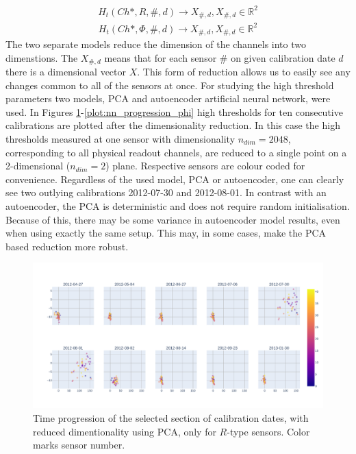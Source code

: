 \begin{align}
  H_{t}(Ch*, R, \#, d) \rightarrow X_{\#,d}, X_{\#,d} \in \mathbb{R}^{2}
  \label{eq:thr_red_R}
\end{align}
\begin{align}
  H_{t}(Ch*, \Phi, \#, d) \rightarrow X_{\#,d}, X_{\#,d} \in \mathbb{R}^{2}
  \label{eq:thr_red_phi}
\end{align}
The two separate models reduce the dimension of the channels into two dimenstions. The $X_{\#,d}$ means that for each sensor $\#$ on given calibration date $d$ there is a dimensional vector $X$.
This form of reduction allows us to easily see any changes common to all of the sensors at once. For studying the high threshold parameters two models, PCA and autoencoder artificial neural network, were used.
In Figures \ref{plot:pca_progression_phi}-\ref{plot:nn_progression_phi} high thresholds for ten consecutive calibrations are plotted after the dimensionality reduction. In this case the high thresholds measured at one sensor with dimensionality $n_{dim}=2048$, corresponding to all physical readout channels, are reduced to a single point on a 2-dimensional ($n_{dim}=2$) plane.
Respective sensors are colour coded for convenience.
Regardless of the used model, PCA or autoencoder, one can clearly see two outlying calibrations 2012-07-30 and 2012-08-01.
In contrast with an autoencoder, the PCA is deterministic and does not require random initialisation. Because of this, there may be some variance in autoencoder model results, even when using exactly the same setup. This may, in some cases, make the PCA based reduction more robust.

\begin{figure}[H]
    \centering
    \includegraphics[width=\linewidth]{figures/chapter4/dimred/PCA_module_R_together.pdf}
    \caption{Time progression of the selected section of calibration dates, with reduced dimentionality using PCA, only for $R$-type sensors. Color marks sensor number.}
   \label{plot:pca_progression_phi}
  \end{figure}

